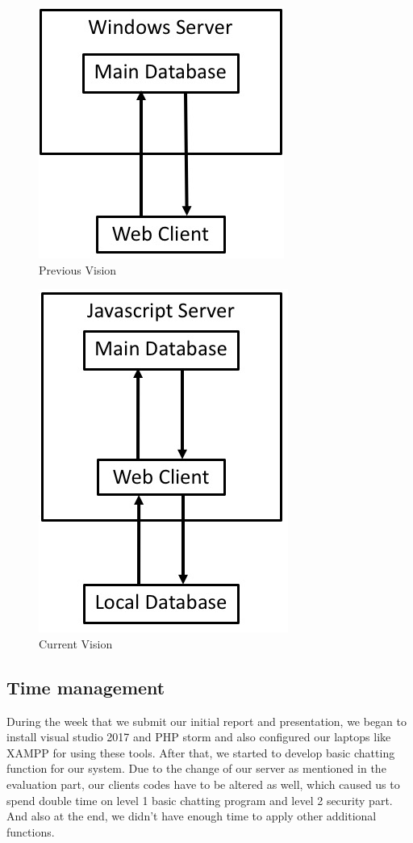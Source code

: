 \documentclass[a4paper,11pt]{article}
\begin{document}
\begin{figure}[!h]
\centering
\includegraphics[width = 0.3 \textwidth ]{previous_vision.jpeg}
\caption{\label{fig:UML}Previous Vision}
\end{figure}
\begin{figure}[!h]
\centering
\includegraphics[width = 0.3 \textwidth ]{current_vision.jpeg}
\caption{\label{fig:UML}Current Vision}
\end{figure}



\subsection{Time management}

During the week that we submit our initial report and presentation, we began to install visual studio 2017 and PHP storm and also configured our laptops like XAMPP for using these tools. After that, we started to develop basic chatting function for our system. Due to the change of our server as mentioned in the evaluation part, our clients codes have to be altered as well, which caused us to spend double time on level 1 basic chatting program and level 2 security part. And also at the end, we didn't have enough time to apply other additional functions.    
\end{document}
